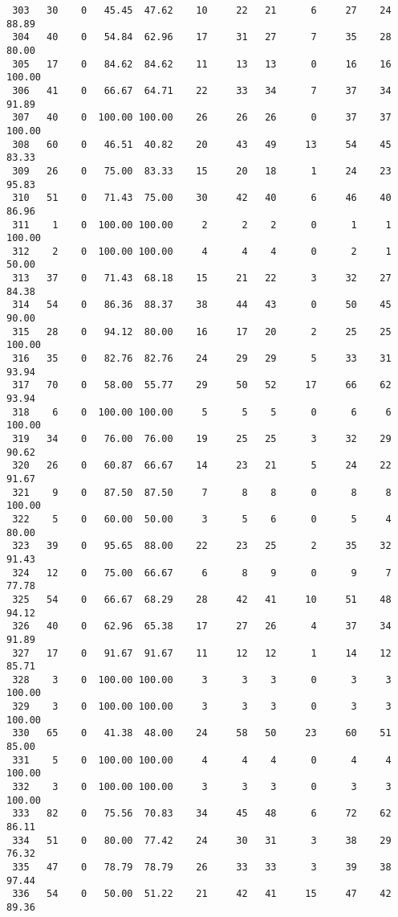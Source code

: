 \begin{verbatim}
 303   30    0   45.45  47.62    10     22   21      6     27    24    88.89
 304   40    0   54.84  62.96    17     31   27      7     35    28    80.00
 305   17    0   84.62  84.62    11     13   13      0     16    16   100.00
 306   41    0   66.67  64.71    22     33   34      7     37    34    91.89
 307   40    0  100.00 100.00    26     26   26      0     37    37   100.00
 308   60    0   46.51  40.82    20     43   49     13     54    45    83.33
 309   26    0   75.00  83.33    15     20   18      1     24    23    95.83
 310   51    0   71.43  75.00    30     42   40      6     46    40    86.96
 311    1    0  100.00 100.00     2      2    2      0      1     1   100.00
 312    2    0  100.00 100.00     4      4    4      0      2     1    50.00
 313   37    0   71.43  68.18    15     21   22      3     32    27    84.38
 314   54    0   86.36  88.37    38     44   43      0     50    45    90.00
 315   28    0   94.12  80.00    16     17   20      2     25    25   100.00
 316   35    0   82.76  82.76    24     29   29      5     33    31    93.94
 317   70    0   58.00  55.77    29     50   52     17     66    62    93.94
 318    6    0  100.00 100.00     5      5    5      0      6     6   100.00
 319   34    0   76.00  76.00    19     25   25      3     32    29    90.62
 320   26    0   60.87  66.67    14     23   21      5     24    22    91.67
 321    9    0   87.50  87.50     7      8    8      0      8     8   100.00
 322    5    0   60.00  50.00     3      5    6      0      5     4    80.00
 323   39    0   95.65  88.00    22     23   25      2     35    32    91.43
 324   12    0   75.00  66.67     6      8    9      0      9     7    77.78
 325   54    0   66.67  68.29    28     42   41     10     51    48    94.12
 326   40    0   62.96  65.38    17     27   26      4     37    34    91.89
 327   17    0   91.67  91.67    11     12   12      1     14    12    85.71
 328    3    0  100.00 100.00     3      3    3      0      3     3   100.00
 329    3    0  100.00 100.00     3      3    3      0      3     3   100.00
 330   65    0   41.38  48.00    24     58   50     23     60    51    85.00
 331    5    0  100.00 100.00     4      4    4      0      4     4   100.00
 332    3    0  100.00 100.00     3      3    3      0      3     3   100.00
 333   82    0   75.56  70.83    34     45   48      6     72    62    86.11
 334   51    0   80.00  77.42    24     30   31      3     38    29    76.32
 335   47    0   78.79  78.79    26     33   33      3     39    38    97.44
 336   54    0   50.00  51.22    21     42   41     15     47    42    89.36

\end{verbatim}
